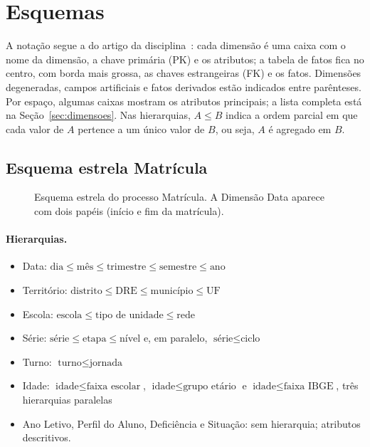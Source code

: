 \documentclass[11pt,a4paper]{article}
\newcommand{\hier}[1]{$#1$}
\begin{document}
\clearpage
\section{Esquemas}
\label{sec:esquemas}

A notação segue a do artigo da disciplina~\cite{ciferri-saude}: cada dimensão é uma caixa com o nome da dimensão, a chave primária (PK) e os atributos; a tabela de fatos fica no centro, com borda mais grossa, as chaves estrangeiras (FK) e os fatos. Dimensões degeneradas, campos artificiais e fatos derivados estão indicados entre parênteses. Por espaço, algumas caixas mostram os atributos principais; a lista completa está na Seção~\ref{sec:dimensoes}. Nas hierarquias, $A \leq B$ indica a ordem parcial em que cada valor de $A$ pertence a um único valor de $B$, ou seja, $A$ é agregado em $B$.

\subsection{Esquema estrela Matrícula}

\begin{figure}[H]
\centering
\resizebox{\linewidth}{!}{}
\caption{Esquema estrela do processo Matrícula. A Dimensão Data aparece com dois papéis (início e fim da matrícula).}
\end{figure}

\paragraph{Hierarquias.}
\begin{itemize}
\item Data: \hier{\text{dia} \leq \text{mês} \leq \text{trimestre} \leq \text{semestre} \leq \text{ano}}
\item Território: \hier{\text{distrito} \leq \text{DRE} \leq \text{município} \leq \text{UF}}
\item Escola: \hier{\text{escola} \leq \text{tipo de unidade} \leq \text{rede}}
\item Série: \hier{\text{série} \leq \text{etapa} \leq \text{nível}} e, em paralelo, \hier{\text{série} \leq \text{ciclo}}
\item Turno: \hier{\text{turno} \leq \text{jornada}}
\item Idade: \hier{\text{idade} \leq \text{faixa escolar}}, \hier{\text{idade} \leq \text{grupo etário}} e \hier{\text{idade} \leq \text{faixa IBGE}}, três hierarquias paralelas
\item Ano Letivo, Perfil do Aluno, Deficiência e Situação: sem hierarquia; atributos descritivos.
\end{itemize}
\end{document}
